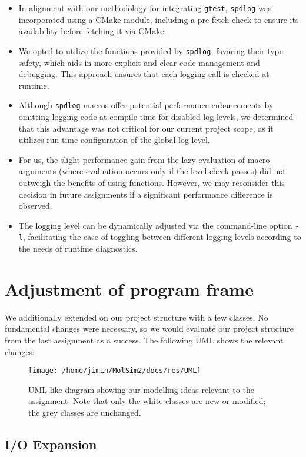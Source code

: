 \documentclass{article}
\begin{document}
\begin{itemize}
    \item In alignment with our methodology for integrating \verb|gtest|, \verb|spdlog| was incorporated using a CMake module, including a pre-fetch check to ensure its availability before fetching it via CMake.
    \item We opted to utilize the functions provided by \verb|spdlog|, favoring their type safety, which aids in more explicit and clear code management and debugging. This approach ensures that each logging call is checked at runtime.
    \item Although \verb|spdlog| macros offer potential performance enhancements by omitting logging code at compile-time for disabled log levels, we determined that this advantage was not critical for our current project scope, as it utilizes run-time configuration of the global log level.
    \item For us, the slight performance gain from the lazy evaluation of macro arguments (where evaluation occurs only if the level check passes) did not outweigh the benefits of using functions. However, we may reconsider this decision in future assignments if a significant performance difference is observed.
    \item The logging level can be dynamically adjusted via the command-line option \texttt{-l}, facilitating the ease of toggling between different logging levels according to the needs of runtime diagnostics.
\end{itemize}

\section{Adjustment of program frame}
\label{sec:adj}
We additionally extended on our project structure with a few classes. 
No fundamental changes were necessary, so we would evaluate our project structure from the last assignment as a success. The following UML shows the relevant changes:
\begin{figure}[H]
    \texttt{[image: /home/jimin/MolSim2/docs/res/UML]}
    \caption{UML-like diagram showing our modelling ideas relevant to the assignment. Note that only the white classes are new or modified; the grey classes are unchanged.}
\end{figure}


\subsection{I/O Expansion}
\label{subsec:file}
\end{document}
